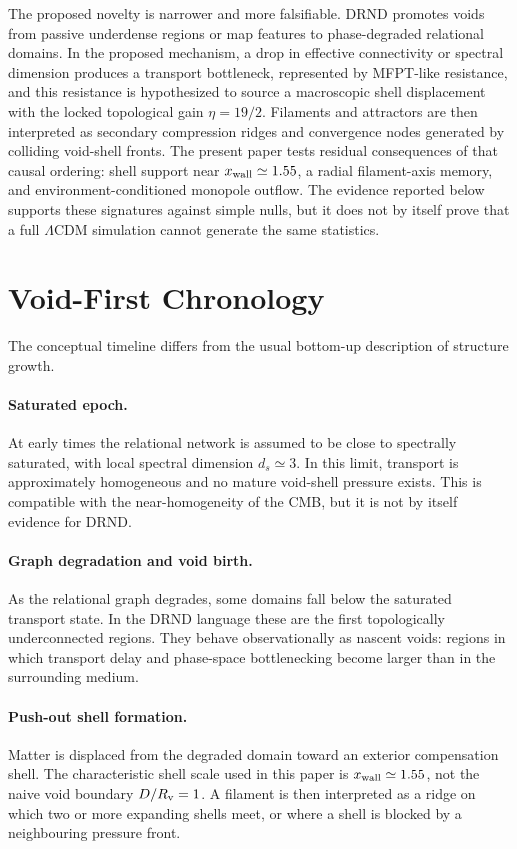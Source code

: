 \documentclass[11pt,a4paper]{article}
\begin{document}
The proposed novelty is narrower and more falsifiable. DRND promotes voids from passive underdense regions or map features to phase-degraded relational domains. In the proposed mechanism, a drop in effective connectivity or spectral dimension produces a transport bottleneck, represented by MFPT-like resistance, and this resistance is hypothesized to source a macroscopic shell displacement with the locked topological gain $\eta=19/2$. Filaments and attractors are then interpreted as secondary compression ridges and convergence nodes generated by colliding void-shell fronts. The present paper tests residual consequences of that causal ordering: shell support near $x_{\rm wall}\simeq1.55$, a radial filament-axis memory, and environment-conditioned monopole outflow. The evidence reported below supports these signatures against simple nulls, but it does not by itself prove that a full $\Lambda$CDM simulation cannot generate the same statistics.

\section{Void-First Chronology}

The conceptual timeline differs from the usual bottom-up description of structure growth.

\paragraph{Saturated epoch.}
At early times the relational network is assumed to be close to spectrally saturated, with local spectral dimension $d_s\simeq3$. In this limit, transport is approximately homogeneous and no mature void-shell pressure exists. This is compatible with the near-homogeneity of the CMB, but it is not by itself evidence for DRND.

\paragraph{Graph degradation and void birth.}
As the relational graph degrades, some domains fall below the saturated transport state. In the DRND language these are the first topologically underconnected regions. They behave observationally as nascent voids: regions in which transport delay and phase-space bottlenecking become larger than in the surrounding medium.

\paragraph{Push-out shell formation.}
Matter is displaced from the degraded domain toward an exterior compensation shell. The characteristic shell scale used in this paper is $x_{\rm wall}\simeq1.55$, not the naive void boundary $D/R_{\rm v}=1$. A filament is then interpreted as a ridge on which two or more expanding shells meet, or where a shell is blocked by a neighbouring pressure front.
\end{document}
